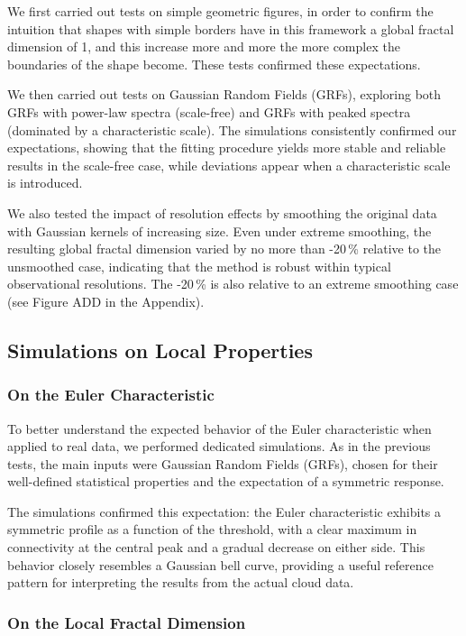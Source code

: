We first carried out tests on simple geometric figures, in order to confirm the intuition that shapes with simple borders have in this framework a global fractal dimension of 1, and this increase more and more the more complex the boundaries of the shape become. These tests confirmed these expectations.

We then carried out tests on Gaussian Random Fields (GRFs), exploring both GRFs with power-law spectra (scale-free) and GRFs with peaked spectra (dominated by a characteristic scale).  
The simulations consistently confirmed our expectations, showing that the fitting procedure yields more stable and reliable results in the scale-free case, while deviations appear when a characteristic scale is introduced.

We also tested the impact of resolution effects by smoothing the original data with Gaussian kernels of increasing size.  
Even under extreme smoothing, the resulting global fractal dimension varied by no more than -20\,\% relative to the unsmoothed case, indicating that the method is robust within typical observational resolutions. The -20\,\% is also relative to an extreme smoothing case (see Figure ADD in the Appendix).

\subsection{Simulations on Local Properties}

\subsubsection{On the Euler Characteristic}

To better understand the expected behavior of the Euler characteristic when applied to real data, we performed dedicated simulations.  
As in the previous tests, the main inputs were Gaussian Random Fields (GRFs), chosen for their well-defined statistical properties and the expectation of a symmetric response.  

The simulations confirmed this expectation: the Euler characteristic exhibits a symmetric profile as a function of the threshold, with a clear maximum in connectivity at the central peak and a gradual decrease on either side.  
This behavior closely resembles a Gaussian bell curve, providing a useful reference pattern for interpreting the results from the actual cloud data.

\subsubsection{On the Local Fractal Dimension}

